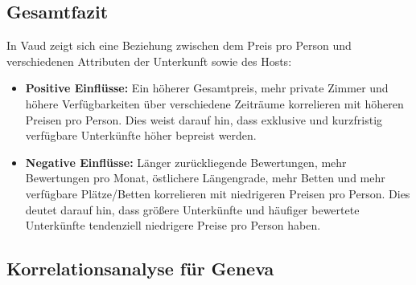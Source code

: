\documentclass[
  journal,
]{IEEEtran}%
\begin{document}
\subsection{Gesamtfazit}\label{gesamtfazit-1}

In Vaud zeigt sich eine Beziehung zwischen dem Preis pro Person und
verschiedenen Attributen der Unterkunft sowie des Hosts:

\begin{itemize}
\item
  \textbf{Positive Einflüsse:} Ein höherer Gesamtpreis, mehr private
  Zimmer und höhere Verfügbarkeiten über verschiedene Zeiträume
  korrelieren mit höheren Preisen pro Person. Dies weist darauf hin,
  dass exklusive und kurzfristig verfügbare Unterkünfte höher bepreist
  werden.
\item
  \textbf{Negative Einflüsse:} Länger zurückliegende Bewertungen, mehr
  Bewertungen pro Monat, östlichere Längengrade, mehr Betten und mehr
  verfügbare Plätze/Betten korrelieren mit niedrigeren Preisen pro
  Person. Dies deutet darauf hin, dass größere Unterkünfte und häufiger
  bewertete Unterkünfte tendenziell niedrigere Preise pro Person haben.
\end{itemize}

\subsection{\texorpdfstring{\textbf{Korrelationsanalyse für
Geneva}}{Korrelationsanalyse für Geneva}}\label{korrelationsanalyse-fuxfcr-geneva}
\end{document}

